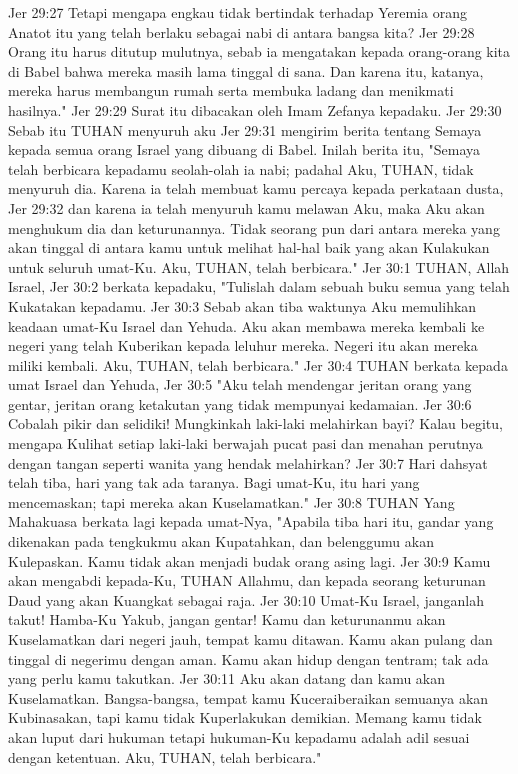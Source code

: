 Jer 29:27  Tetapi mengapa engkau tidak bertindak terhadap Yeremia orang Anatot itu yang telah berlaku sebagai nabi di antara bangsa kita?
Jer 29:28  Orang itu harus ditutup mulutnya, sebab ia mengatakan kepada orang-orang kita di Babel bahwa mereka masih lama tinggal di sana. Dan karena itu, katanya, mereka harus membangun rumah serta membuka ladang dan menikmati hasilnya."
Jer 29:29  Surat itu dibacakan oleh Imam Zefanya kepadaku.
Jer 29:30  Sebab itu TUHAN menyuruh aku
Jer 29:31  mengirim berita tentang Semaya kepada semua orang Israel yang dibuang di Babel. Inilah berita itu, "Semaya telah berbicara kepadamu seolah-olah ia nabi; padahal Aku, TUHAN, tidak menyuruh dia. Karena ia telah membuat kamu percaya kepada perkataan dusta,
Jer 29:32  dan karena ia telah menyuruh kamu melawan Aku, maka Aku akan menghukum dia dan keturunannya. Tidak seorang pun dari antara mereka yang akan tinggal di antara kamu untuk melihat hal-hal baik yang akan Kulakukan untuk seluruh umat-Ku. Aku, TUHAN, telah berbicara."
Jer 30:1  TUHAN, Allah Israel,
Jer 30:2  berkata kepadaku, "Tulislah dalam sebuah buku semua yang telah Kukatakan kepadamu.
Jer 30:3  Sebab akan tiba waktunya Aku memulihkan keadaan umat-Ku Israel dan Yehuda. Aku akan membawa mereka kembali ke negeri yang telah Kuberikan kepada leluhur mereka. Negeri itu akan mereka miliki kembali. Aku, TUHAN, telah berbicara."
Jer 30:4  TUHAN berkata kepada umat Israel dan Yehuda,
Jer 30:5  "Aku telah mendengar jeritan orang yang gentar, jeritan orang ketakutan yang tidak mempunyai kedamaian.
Jer 30:6  Cobalah pikir dan selidiki! Mungkinkah laki-laki melahirkan bayi? Kalau begitu, mengapa Kulihat setiap laki-laki berwajah pucat pasi dan menahan perutnya dengan tangan seperti wanita yang hendak melahirkan?
Jer 30:7  Hari dahsyat telah tiba, hari yang tak ada taranya. Bagi umat-Ku, itu hari yang mencemaskan; tapi mereka akan Kuselamatkan."
Jer 30:8  TUHAN Yang Mahakuasa berkata lagi kepada umat-Nya, "Apabila tiba hari itu, gandar yang dikenakan pada tengkukmu akan Kupatahkan, dan belenggumu akan Kulepaskan. Kamu tidak akan menjadi budak orang asing lagi.
Jer 30:9  Kamu akan mengabdi kepada-Ku, TUHAN Allahmu, dan kepada seorang keturunan Daud yang akan Kuangkat sebagai raja.
Jer 30:10  Umat-Ku Israel, janganlah takut! Hamba-Ku Yakub, jangan gentar! Kamu dan keturunanmu akan Kuselamatkan dari negeri jauh, tempat kamu ditawan. Kamu akan pulang dan tinggal di negerimu dengan aman. Kamu akan hidup dengan tentram; tak ada yang perlu kamu takutkan.
Jer 30:11  Aku akan datang dan kamu akan Kuselamatkan. Bangsa-bangsa, tempat kamu Kuceraiberaikan semuanya akan Kubinasakan, tapi kamu tidak Kuperlakukan demikian. Memang kamu tidak akan luput dari hukuman tetapi hukuman-Ku kepadamu adalah adil sesuai dengan ketentuan. Aku, TUHAN, telah berbicara."
